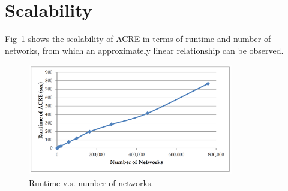 \documentclass{report}
\begin{document}
\section{Scalability}

Fig~\ref{fig:12} shows the scalability of ACRE in terms of runtime and number of networks, from
which an approximately linear relationship can be observed.

\begin{figure}
	\centering
		\includegraphics[width=0.8\textwidth]{12}
	\caption{Runtime v.s. number of networks.}
	\label{fig:12}
\end{figure}



\end{document}

